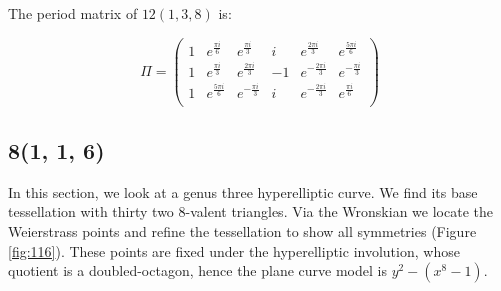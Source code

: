 \documentclass[12pt,reqno]{amsart}
\newtheorem{theorem}{Theorem}
\theoremstyle{definition}
\theoremstyle{remark}
\newtheorem*{remark}{Remark}
\begin{document}


The period matrix of $12(1, 3, 8)$ is: 

$$\Pi = \begin{pmatrix} 1 & e^{\frac{\pi i}{6}} & e^{\frac{\pi i}{3}} & i & e^{\frac{2 \pi i}{3}} & e^{\frac{5 \pi i}{6}} \\
 1 & e^{\frac{\pi i}{3}} & e^{\frac{2 \pi i}{3}} & -1 & e^{-\frac{2 \pi i}{3}} & e^{-\frac{\pi i}{3}} \\
 1 & e^{\frac{5 \pi i}{6}} & e^{-\frac{\pi i}{3}} & i & e^{-\frac{2 \pi i}{3}} & e^{\frac{\pi i}{6}} \\
\end{pmatrix}$$


\subsection{8(1, 1, 6)}
In this section, we look at a genus three hyperelliptic curve. We find its base tessellation with thirty two 8-valent triangles. Via the Wronskian we locate the Weierstrass points and refine the tessellation to show all symmetries (Figure~ \cref{fig:116}). These points are fixed under the hyperelliptic involution, whose quotient is a doubled-octagon, hence the plane curve model is $y^2 - (x^8 - 1).$ 
\end{document}
